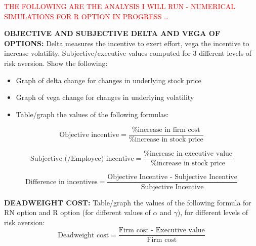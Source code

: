 
\textcolor{red}{THE FOLLOWING ARE THE ANALYSIS I WILL RUN - NUMERICAL SIMULATIONS FOR R OPTION IN PROGRESS \dots}

\textbf{OBJECTIVE AND SUBJECTIVE DELTA AND VEGA OF OPTIONS:}
    Delta measures the incentive to exert effort, vega the incentive to increase volatility. Subjective/executive values computed for 3 different levels of risk aversion. Show the following:

    \begin{itemize}
        \item Graph of delta change for changes in underlying stock price
        \item Graph of vega change for changes in underlying volatility
        \item Table/graph the values of the following formulas:
    \end{itemize}

$$ \text{Objective incentive} = \frac{\text{\% increase in firm cost}}{\text{\% increase in stock price}} $$


$$ \text{Subjective (/Employee) incentive} = \frac{\text{\%  increase in executive value}}{\text{\% increase in stock price}}$$

$$\text{Difference in incentives} = \frac{\text{Objective Incentive - Subjective Incentive}}{\text{Subjective Incentive}} $$

\vspace*{20pt}


\textbf{DEADWEIGHT COST:}
Table/graph the values of the following formula for RN option and R option (for different values of $\alpha$ and $\gamma$), for different levels of risk aversion:
$$ \text{Deadweight cost} = \frac{\text{Firm cost - Executive value}}{\text{Firm cost}}  $$
    \vspace*{20pt}


